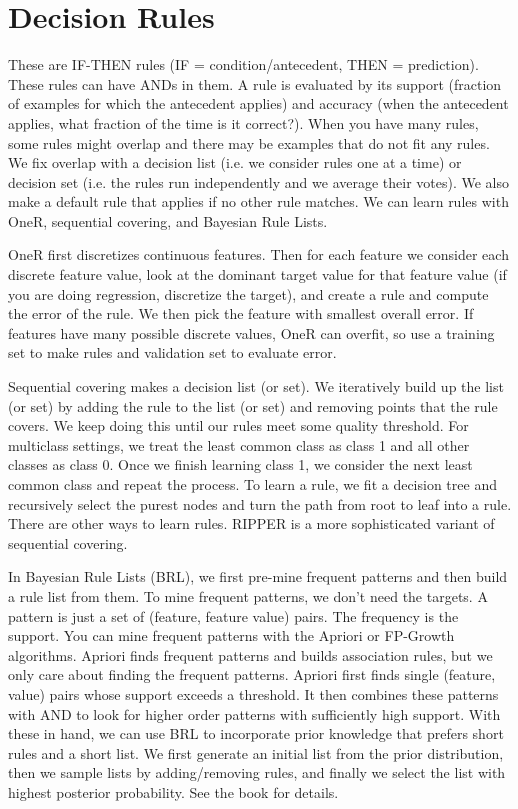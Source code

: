 \documentclass[a4paper]{article}
\begin{document}
\section{Decision Rules}
These are IF-THEN rules (IF = condition/antecedent, THEN = prediction). These
rules can have ANDs in them. A rule is evaluated by its support (fraction
of examples for which the antecedent applies) and accuracy (when the antecedent
applies, what fraction of the time is it correct?). When you have many rules,
some rules might overlap and there may be examples that do not fit any rules.
We fix overlap with a decision list (i.e. we consider rules one at a time) or
decision set (i.e. the rules run independently and we average their votes). We
also make a default rule that applies if no other rule matches. We can learn
rules with OneR, sequential covering, and Bayesian Rule Lists.

OneR first discretizes continuous features. Then for each feature we consider
each discrete feature value, look at the dominant target value for that
feature value (if you are doing regression, discretize the target), and create a
rule and
compute the error of the rule. We then pick the feature with smallest overall
error. If features have many possible discrete values, OneR can overfit, so use
a training set to make rules and validation set to evaluate error.

Sequential covering makes a decision list (or set). We iteratively build up
the list (or set) by adding the rule to the list (or set) and removing points
that the rule covers. We keep doing this until our rules meet some quality
threshold. For multiclass settings, we treat the least common class as class 1
and all other classes as class 0. Once we finish learning class 1, we consider
the next least common class and repeat the process. To learn a rule, we fit
a decision tree and recursively select the purest nodes and turn the path from
root to leaf into a rule. There are other ways to learn rules. RIPPER is a
more sophisticated variant of sequential covering.

In Bayesian Rule Lists (BRL), we first pre-mine frequent patterns and then build
a rule list from them. To mine frequent patterns, we don't need the targets.
A pattern is just a set of (feature, feature value) pairs. The frequency is
the support. You can mine frequent patterns with the Apriori or FP-Growth
algorithms. Apriori finds frequent patterns and builds association rules, but we
only care about finding the frequent patterns. Apriori first finds single
(feature, value) pairs whose support exceeds a threshold. It then combines
these patterns with AND to look for higher order patterns with sufficiently
high support. With these in hand, we can use BRL to incorporate prior knowledge
that prefers short rules and a short list. We first generate an initial list
from the prior distribution, then we sample lists by adding/removing rules,
and finally we select the list with highest posterior probability. See the book
for details.
\end{document}
